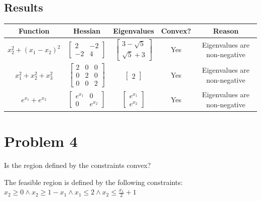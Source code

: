 \documentclass{article}%
\begin{document}
%
\subsection*{Results}%
\label{subsec:Results}%
\begin{table}[H]%
\centering%
\begin{tabular}{c|c|c|c|c}%
\hline%
Function&Hessian&Eigenvalues&Convex?&Reason\\%
\hline%
$x_{2}^{2} + \left(x_{1} - x_{2}\right)^{2}$&$\left[\begin{matrix}2 & -2\\-2 & 4\end{matrix}\right]$&$\left[\begin{matrix}3 - \sqrt{5}\\\sqrt{5} + 3\end{matrix}\right]$&Yes&Eigenvalues are non{-}negative\\%
\hline%
$x_{1}^{2} + x_{2}^{2} + x_{3}^{2}$&$\left[\begin{matrix}2 & 0 & 0\\0 & 2 & 0\\0 & 0 & 2\end{matrix}\right]$&$\left[\begin{matrix}2\end{matrix}\right]$&Yes&Eigenvalues are non{-}negative\\%
\hline%
$e^{x_{1}} + e^{x_{2}}$&$\left[\begin{matrix}e^{x_{1}} & 0\\0 & e^{x_{2}}\end{matrix}\right]$&$\left[\begin{matrix}e^{x_{1}}\\e^{x_{2}}\end{matrix}\right]$&Yes&Eigenvalues are non{-}negative\\%
\hline%
\end{tabular}%
\end{table}

%
\section*{Problem 4}%
\label{sec:Problem4}%
Is the region defined by the constraints convex?%
\par%
The feasible region is defined by the following constraints: %
$x_{2} \geq 0 \wedge x_{2} \geq 1 - x_{1} \wedge x_{1} \leq 2 \wedge x_{2} \leq \frac{x_{1}}{2} + 1$%
\par%
\end{document}
